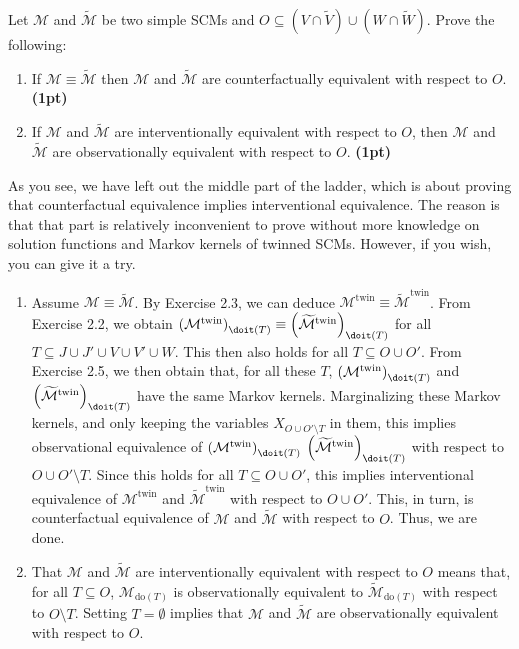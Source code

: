   Let $\mathcal{M}$ and $\widetilde{\mathcal{M}}$ be two simple SCMs and $O \subseteq (V \cap \widetilde{V}) \cup (W \cap \widetilde{W})$. 
  Prove the following:
  \begin{enumerate}
    \item If $\mathcal{M} \equiv \widetilde{\mathcal{M}}$ then $\mathcal{M}$ and $\widetilde{\mathcal{M}}$ are counterfactually equivalent with respect to $O$.  \textbf{(1pt)}
    \item If $\mathcal{M}$ and $\widetilde{\mathcal{M}}$ are interventionally equivalent with respect to $O$, then $\mathcal{M}$ and $\widetilde{\mathcal{M}}$ are observationally equivalent with respect to $O$.   \textbf{(1pt)} 
    \end{enumerate}
    As you see, we have left out the middle part of the ladder, which is about proving that counterfactual equivalence implies interventional equivalence. 
    The reason is that that part is relatively inconvenient to prove without more knowledge on solution functions and Markov kernels of twinned SCMs.
    However, if you wish, you can give it a try.
  \begin{gradedsolution}
    \begin{enumerate}
      \item Assume $\mathcal{M} \equiv \widetilde{\mathcal{M}}$.
	By Exercise 2.3, we can deduce $\mathcal{M}^{\text{twin}} \equiv \widetilde{\mathcal{M}}^{\text{twin}}$.
	From Exercise 2.2, we obtain $\left( \mathcal{M}^{\text{twin}}\right)_{\doit(T)} \equiv \left( \widetilde{\mathcal{M}}^{\text{twin}}\right)_{\doit(T)} $ for all $T \subseteq J \cup J' \cup V \cup V' \cup W$.
	This then also holds for all $T \subseteq O \cup O'$.
	From Exercise 2.5, we then obtain that, for all these $T$, $\left( \mathcal{M}^{\text{twin}}\right)_{\doit(T)} $ and $\left( \widetilde{\mathcal{M}}^{\text{twin}}\right)_{\doit(T)} $ have the same Markov kernels.
	Marginalizing these Markov kernels, and only keeping the variables $X_{O \cup O' \setminus T}$ in them, this implies observational equivalence of $\left( \mathcal{M}^{\text{twin}}\right)_{\doit(T)} $ $\left( \widetilde{\mathcal{M}}^{\text{twin}}\right)_{\doit(T)} $ with respect to $O \cup O' \setminus T$.
	Since this holds for all $T \subseteq O \cup O'$, this implies interventional equivalence of $\mathcal{M}^{\text{twin}}$ and $\widetilde{\mathcal{M}}^{\text{twin}}$ with respect to $O \cup O'$.
	This, in turn, is counterfactual equivalence of $\mathcal{M}$ and $\widetilde{\mathcal{M}}$ with respect to $O$.
	Thus, we are done.
	  \item That $\mathcal{M}$ and $\widetilde{\mathcal{M}}$ are interventionally equivalent with respect to $O$ means that, for all $T \subseteq O$, $\mathcal{M}_{\text{do}(T)}$ is observationally equivalent to $\widetilde{\mathcal{M}}_{\text{do}(T)}$ with respect to $O \setminus T$.
	    Setting $T = \emptyset$ implies that $\mathcal{M}$ and $\widetilde{\mathcal{M}}$ are observationally equivalent with respect to $O$.
      \end{enumerate}
  \end{gradedsolution}

